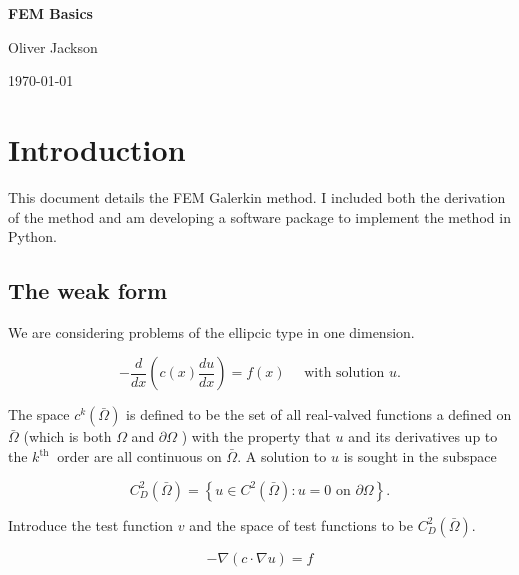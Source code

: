 \documentclass[12pt, oneside]{book}
\begin{document}
\begin{titlepage}
    \centering
    
    \vspace*{3cm} 
    
    {\Huge \textbf{FEM Basics}\par}
    
    \vspace*{3cm} 
    \vfill
    
    {\small Oliver Jackson\par}
    
    \vspace*{0.5cm} 

    {\small \today\par}
\end{titlepage}


\tableofcontents

\cleardoublepage
{}

\chapter{Introduction}

This document details the FEM Galerkin method. I included both the derivation of the method and am developing a 
software package to implement the method in Python.

\section{The weak form}

We are considering problems of the ellipcic type in one dimension. 

$$
-\frac{d}{d x}\left(c(x) \frac{d u}{d x}\right)=f(x) \quad \text { with solution } u.
$$ 


The space $c^{k}(\bar{\Omega})$ is defined to be the set of all real-valved functions 
a defined on $\bar{\Omega}$ (which is both $\Omega$ and $\partial \Omega$ ) with the property that 
$u$ and its derivatives up to the $k^{\text {th }}$ order are all continuous on $\bar{\Omega}$. 
A solution to $u$ is sought in the subspace

$$
C_{D}^{2}(\bar{\Omega})=\left\{u \in C^{2}(\bar{\Omega}): u=0 \text { on } \partial \Omega\right\} .
$$

Introduce the test function $v$ and the space of test functions to be $C_{D}^{2}(\bar{\Omega})$.

$$
-\nabla(c \cdot \nabla u)=f
$$
\end{document}
